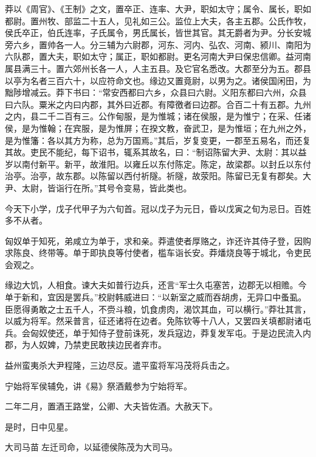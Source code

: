 \documentclass[12pt,UTF8]{ctexbook}
\begin{document}
莽以《周官》、《王制》之文，置卒正、连率、大尹，职如太守；属令、属长，职如都尉。置州牧、部监二十五人，见礼如三公。监位上大夫，各主五郡。公氏作牧，侯氏卒正，伯氏连率，子氏属令，男氏属长，皆世其官。其无爵者为尹。分长安城旁六乡，置帅各一人。分三辅为六尉郡，河东、河内、弘农、河南、颍川、南阳为六队郡，置大夫，职如太守；属正，职如都尉。更名河南大尹曰保忠信卿。益河南属县满三十。置六郊州长各一人，人主五县。及它官名悉改。大郡至分为五。郡县以亭为名者三百六十，以应符命文也。缘边又置竟尉，以男为之。诸侯国闲田，为黜陟增减云。莽下书曰：“常安西都曰六乡，众县曰六尉。义阳东都曰六州，众县曰六队。粟米之内曰内郡，其外曰近郡。有障徼者曰边郡。合百二十有五郡。九州之内，县二千二百有三。公作甸服，是为惟城；诸在侯服，是为惟宁；在采、任诸侯，是为惟翰；在宾服，是为惟屏；在揆文教，奋武卫，是为惟垣；在九州之外，是为惟籓：各以其方为称，总为万国焉。”其后，岁复变更，一郡至五易名，而还复其故。吏民不能纪，每下诏书，辄系其故名，曰：“制诏陈留大尹、太尉：其以益岁以南付新平。新平，故淮阳。以雍丘以东付陈定。陈定，故梁郡。以封丘以东付治亭。治亭，故东郡。以陈留以西付祈隧。祈隧，故荥阳。陈留已无复有郡矣。大尹、太尉，皆诣行在所。”其号令变易，皆此类也。



今天下小学，戊子代甲子为六旬首。冠以戊子为元日，昏以戊寅之旬为忌日。百姓多不从者。



匈奴单于知死，弟咸立为单于，求和亲。莽遣使者厚赂之，诈还许其侍子登，因购求陈良、终带等。单于即执良等付使者，槛车诣长安。莽燔烧良等于城北，令吏民会观之。



缘边大饥，人相食。谏大夫如普行边兵，还言“军士久屯塞苦，边郡无以相赡。今单于新和，宜因是罢兵。”校尉韩威进曰：“以新室之威而吞胡虏，无异口中蚤虱。臣愿得勇敢之士五千人，不赍斗粮，饥食虏肉，渴饮其血，可以横行。”莽壮其言，以威为将军。然采普言，征还诸将在边者。免陈钦等十八人，又罢四关填都尉诸屯兵。会匈奴使还，单于知侍子登前诛死，发兵寇边，莽复发军屯。于是边民流入内郡，为人奴婢，乃禁吏民敢挟边民者弃市。



益州蛮夷杀大尹程隆，三边尽反。遣平蛮将军冯茂将兵击之。



宁始将军侯辅免，讲《易》祭酒戴参为宁始将军。



二年二月，置酒王路堂，公卿、大夫皆佐酒。大赦天下。



是时，日中见星。



大司马苗左迁司命，以延德侯陈茂为大司马。
\end{document}
